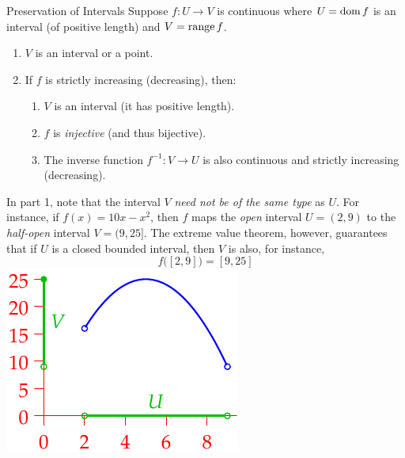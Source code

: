 \begin{cor}{Preservation of Intervals}{}
	Suppose $f:U\to V$ is continuous where $U=\operatorname{dom} f$ is an interval (of positive length) and $V=\operatorname{range} f$.\vspace{-1pt}
	\begin{enumerate}\itemsep0pt
	  \item $V$ is an interval or a point.
	  \item If $f$ is strictly increasing (decreasing), then:\vspace{-3pt}
		\begin{enumerate}
		  \item $V$ is an interval (it has positive length).
		  \item $f$ is \emph{injective} (and thus bijective).
		  \item The inverse function $f^{-1}:V\to U$ is also continuous and strictly increasing (decreasing).
		\end{enumerate}
	\end{enumerate}
\end{cor}

\begin{example}[lower separated=false, sidebyside, sidebyside align=top seam, sidebyside gap=0pt, righthand width=0.3\linewidth]{}{}
	In part 1, note that the interval $V$ \emph{need not be of the same type} as $U$. For instance, if $f(x)=10x-x^2$, then $f$ maps the \emph{open} interval $U=(2,9)$ to the \emph{half-open} interval $V=(9,25]$.\smallbreak
	The extreme value theorem, however, guarantees that if $U$ is a closed bounded interval, then $V$ is also, for instance,
	\[
		f\bigl([2,9]\bigr)=[9,25]
	\]
	\tcblower
	\flushright\includegraphics[scale=0.95]{intval4}
\end{example}


